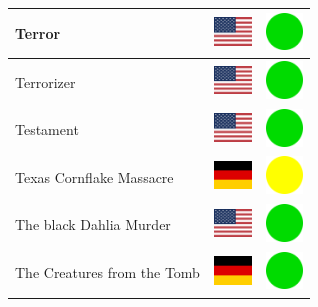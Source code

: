 \documentclass[12pt, a4paper, twoside]{report}
\begin{document}
\begin{center}
\begin{longtable}{|p{5cm}|p{2cm}|p{2cm}|}
 Terror                                                     & \includegraphics[width=1cm]{../img/flags/us} &   \includegraphics[width=1cm]{../likes/y} \\ \hline
 Terrorizer                                                 & \includegraphics[width=1cm]{../img/flags/us} &   \includegraphics[width=1cm]{../likes/y} \\ \hline
 Testament                                                  & \includegraphics[width=1cm]{../img/flags/us} &   \includegraphics[width=1cm]{../likes/y} \\ \hline
 Texas Cornflake Massacre                                   & \includegraphics[width=1cm]{../img/flags/de} &   \includegraphics[width=1cm]{../likes/m} \\ \hline
 The black Dahlia Murder                                    & \includegraphics[width=1cm]{../img/flags/us} &   \includegraphics[width=1cm]{../likes/y} \\ \hline
 The Creatures from the Tomb                                & \includegraphics[width=1cm]{../img/flags/de} &   \includegraphics[width=1cm]{../likes/y} \\ \hline

\end{longtable}
\end{center}
\end{document}
